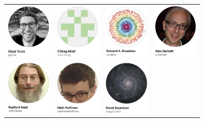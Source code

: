 \documentclass[10pt]{report}
\begin{document}
\begin{center}
  \begin{tabular}{cccc}
    \includegraphics[width=0.85in]{img/turok.png}
    & \includegraphics[width=0.85in]{img/modi.png}
    & \includegraphics[width=0.85in]{img/roualdes.png}
    & \includegraphics[width=0.85in]{img/barnett.png}
    \\
    \includegraphics[width=0.85in]{img/neal.png}
    & \includegraphics[width=0.85in]{img/hoffman.png}
    & \includegraphics[width=0.85in]{img/sountsov.png}
  \end{tabular}
\end{center}
\end{document}
